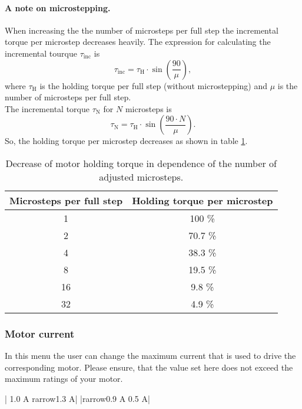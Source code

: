 \paragraph{A note on microstepping.}
When increasing the the number of microsteps per full step the incremental
torque per microstep decreases heavily. The expression for calculating
the incremental tourque $\tau_{\text{inc}}$ is
\begin{equation*}
  \tau_{\text{inc}} = \tau_{\text{H}} \cdot \sin \left( \frac{90}{\mu} \right),
\end{equation*}
where $\tau_{\text{H}}$ is the holding torque per full step (without
microstepping) and $\mu$ is the number of microsteps per full step.\\
The incremental torque $\tau_{\text{N}}$ for $N$ microsteps is
\begin{equation*}
  \tau_{\text{N}} = \tau_{\text{H}} \cdot \sin \left( \frac{90\cdot N}{\mu} \right).
\end{equation*}
So, the holding torque per microstep decreases as shown in
table \ref{tab:microstepping_holding_torque}.
\begin{table}
  \centering
  \begin{tabular}{cc}
    \toprule
    \textbf{Microsteps per full step} & \textbf{Holding torque per microstep} \\
    \toprule
    1 & 100 \% \\ \midrule
    2 & 70.7 \%\\ \midrule
    4 & 38.3 \% \\ \midrule
    8 & 19.5 \% \\ \midrule
    16 & 9.8 \% \\ \midrule
    32 & 4.9 \% \\
    \bottomrule
  \end{tabular}
  \caption{Decrease of motor holding torque in dependence of the number of
           adjusted microsteps.}
  \label{tab:microstepping_holding_torque}
\end{table}

\subsubsection{Motor current}
In this menu the user can change the maximum current that is used to drive the corresponding motor. Please ensure, that the value set here does not exceed the maximum ratings of your motor. 
\begin{center}
  | 1.0 A  {rarrow}1.3 A|
             |{rarrow}0.9 A   0.5 A|
\end{center}

